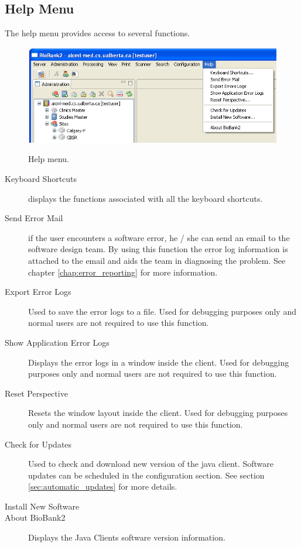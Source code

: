\subsection{Help Menu}
The help menu provides access to several functions.
\begin{figure}[H]
  \centering
  \scalebox{0.5}
	   { \includegraphics*{screenshots/overview/main_menu_help} }
	   \caption{Help menu.}
	   \label{fig:main_menu_help}
\end{figure}
\begin{description}
\item[Keyboard Shortcuts] displays the functions associated with all the
  keyboard shortcuts.
\item[Send Error Mail] if the user encounters a software error, he / she can
  send an email to the software design team. By using this function the error
  log information is attached to the email and aids the team in diagnosing the
  problem. See chapter \ref{chap:error_reporting} for more information.
\item[Export Error Logs] Used to save the error logs to a file. Used for
  debugging purposes only and normal users are not required to use this
  function.
\item[Show Application Error Logs] Displays the error logs in a window inside
  the client. Used for debugging purposes only and normal users are not
  required to use this function.
\item[Reset Perspective] Resets the window layout inside the client. Used for
  debugging purposes only and normal users are not required to use this
  function.
\item[Check for Updates] Used to check and download new version of the java
client. Software updates can be scheduled in the configuration section. See
section \ref{sec:automatic_updates} for more details.
\item[Install New Software] %
\item[About BioBank2] Displays the Java Clients software version information.
\end{description}


